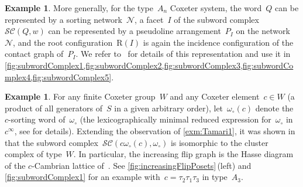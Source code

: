 \documentclass[reqno]{amsart}
\theoremstyle{definition}
\newtheorem{example}[theorem]{Example}
\newcommand{\cal}[1]{\mathcal{#1}} %
\newcommand{\wo}{\omega_\circ} %
\newcommand{\subwordComplex}{\mathcal{SC}} %
\newcommand{\Roots}{\mathrm{R}} %
\begin{document}
\begin{example}
\label{exm:sortingNetworks}
More generally, for the type~$A_n$ Coxeter system, the word~$Q$ can be represented by a sorting network~$\cal{N}$, a facet~$I$ of the subword complex~$\subwordComplex(Q,w)$ can be represented by a pseudoline arrangement~$P_I$ on the network~$\cal{N}$, and the root configuration~$\Roots(I)$ is again the incidence configuration of the contact graph of~$P_I$.
We refer to~\cite{PilaudPocchiola, PilaudSantos-brickPolytope, PilaudStump-brickPolytope} for details of this representation and use it in \cref{fig:subwordComplex1,fig:subwordComplex2,fig:subwordComplex3,fig:subwordComplex4,fig:subwordComplex5}.
\end{example}

\begin{example}
For any finite Coxeter group~$W$ and any Coxeter element~$c \in W$ (a product of all generators of~$S$ in a given arbitrary order), let~$\wo(c)$ denote the $c$-sorting word of~$\wo$ (the lexicographically minimal reduced expression for~$\wo$ in~$c^\infty$, see \cite{Reading-CambrianLattices} for details).
Extending the observation of \cref{exm:Tamari1}, it was shown in~\cite{CeballosLabbeStump} that the subword complex~$\subwordComplex(c\wo(c), \wo)$ is isomorphic to the cluster complex of type~$W$.
In particular, the increasing flip graph is the Hasse diagram of the $c$-Cambrian lattice of~\cite{Reading-CambrianLattices}.
See \cref{fig:increasingFlipPosets}\,(left) and \cref{fig:subwordComplex1} for an example with~$c = \tau_2\tau_1\tau_3$ in type~$A_3$.
\end{example}
\end{document}
